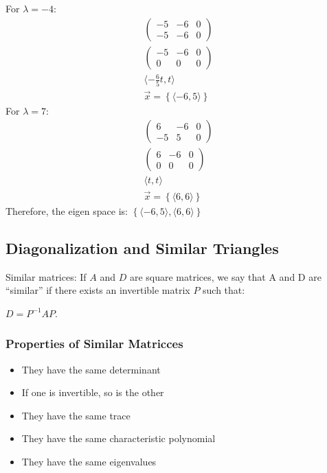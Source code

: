 \documentclass[
  letterpaper,
  DIV=11,
  numbers=noendperiod]{scrartcl}
\providecommand{\tightlist}{%
  \setlength{\itemsep}{0pt}\setlength{\parskip}{0pt}}\usepackage{longtable,booktabs,array}
\begin{document}
For \(\lambda=-4\): \begin{align*}
\left(\begin{array}{cc|c}-5 & -6 & 0 \\ -5 & -6 & 0\end{array}\right) \\
\left(\begin{array}{cc|c}-5 & -6 & 0 \\ 0 & 0 & 0\end{array}\right) \\
\langle-\frac{6}{5}t, t\rangle \\
\vec{x} = \left\{\langle-6, 5\rangle\right\}
\end{align*} For \(\lambda=7\): \begin{align*}
\left(\begin{array}{cc|c}6 & -6 & 0 \\ -5 & 5 & 0\end{array}\right) \\
\left(\begin{array}{cc|c}6 & -6 & 0 \\ 0 & 0 & 0\end{array}\right) \\
\langle t, t\rangle \\
\vec{x} = \left\{\langle6, 6\rangle\right\}
\end{align*} Therefore, the eigen space is:
\(\left\{\langle-6, 5\rangle, \langle6, 6\rangle\right\}\)

\subsection{Diagonalization and Similar
Triangles}\label{diagonalization-and-similar-triangles}

Similar matrices: If \(A\) and \(D\) are square matrices, we say that A
and D are ``similar'' if there exists an invertible matrix \(P\) such
that:

\(D = P^{-1}AP\).

\subsubsection{Properties of Similar
Matricces}\label{properties-of-similar-matricces}

\begin{itemize}
\tightlist
\item
  They have the same determinant
\item
  If one is invertible, so is the other
\item
  They have the same trace
\item
  They have the same characteristic polynomial
\item
  They have the same eigenvalues
\end{itemize}
\end{document}
